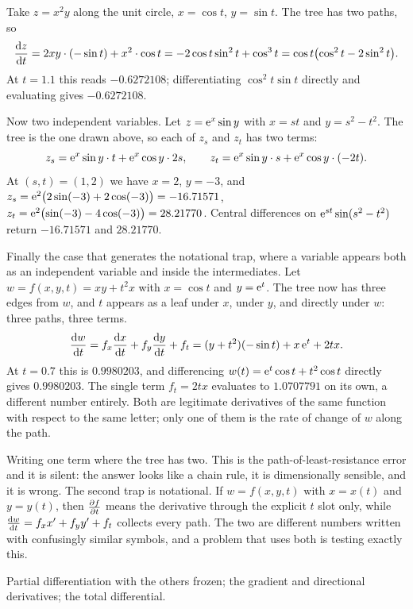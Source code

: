 \begin{worked}
Take $z=x^{2}y$ along the unit circle, $x=\cos t$, $y=\sin t$. The tree has two paths, so
\[
\frac{\mathrm{d}z}{\mathrm{d}t}=2xy\cdot(-\sin t)+x^{2}\cdot\cos t=-2\cos t\sin^{2}t+\cos^{3}t=\cos t\bigl(\cos^{2}t-2\sin^{2}t\bigr).
\]
At $t=1.1$ this reads $-0.6272108$; differentiating $\cos^{2}t\sin t$ directly and evaluating gives $-0.6272108$.

Now two independent variables. Let $z=\mathrm{e}^{x}\sin y$ with $x=st$ and $y=s^{2}-t^{2}$. The tree is the one drawn above, so each of $z_{s}$ and $z_{t}$ has two terms:
\[
z_{s}=\mathrm{e}^{x}\sin y\cdot t+\mathrm{e}^{x}\cos y\cdot 2s,\qquad
z_{t}=\mathrm{e}^{x}\sin y\cdot s+\mathrm{e}^{x}\cos y\cdot(-2t).
\]
At $(s,t)=(1,2)$ we have $x=2$, $y=-3$, and $z_{s}=\mathrm{e}^{2}\bigl(2\sin(-3)+2\cos(-3)\bigr)=-16.71571$, $z_{t}=\mathrm{e}^{2}\bigl(\sin(-3)-4\cos(-3)\bigr)=28.21770$. Central differences on $\mathrm{e}^{st}\sin(s^{2}-t^{2})$ return $-16.71571$ and $28.21770$.

Finally the case that generates the notational trap, where a variable appears both as an independent variable and inside the intermediates. Let $w=f(x,y,t)=xy+t^{2}x$ with $x=\cos t$ and $y=\mathrm{e}^{t}$. The tree now has three edges from $w$, and $t$ appears as a leaf under $x$, under $y$, and directly under $w$: three paths, three terms.
\[
\frac{\mathrm{d}w}{\mathrm{d}t}=f_{x}\frac{\mathrm{d}x}{\mathrm{d}t}+f_{y}\frac{\mathrm{d}y}{\mathrm{d}t}+f_{t}
=(y+t^{2})(-\sin t)+x\,\mathrm{e}^{t}+2tx .
\]
At $t=0.7$ this is $0.9980203$, and differencing $w(t)=\mathrm{e}^{t}\cos t+t^{2}\cos t$ directly gives $0.9980203$. The single term $f_{t}=2tx$ evaluates to $1.0707791$ on its own, a different number entirely. Both are legitimate derivatives of the same function with respect to the same letter; only one of them is the rate of change of $w$ along the path.
\end{worked}

\begin{trap}
Writing one term where the tree has two. This is the path-of-least-resistance error and it is silent: the answer looks like a chain rule, it is dimensionally sensible, and it is wrong. The second trap is notational. If $w=f(x,y,t)$ with $x=x(t)$ and $y=y(t)$, then $\frac{\partial f}{\partial t}$ means the derivative through the explicit $t$ slot only, while $\frac{\mathrm{d}w}{\mathrm{d}t}=f_{x}x'+f_{y}y'+f_{t}$ collects every path. The two are different numbers written with confusingly similar symbols, and a problem that uses both is testing exactly this.
\end{trap}

\begin{seealsob}Partial differentiation with the others frozen; the gradient and directional derivatives; the total differential.\end{seealsob}

